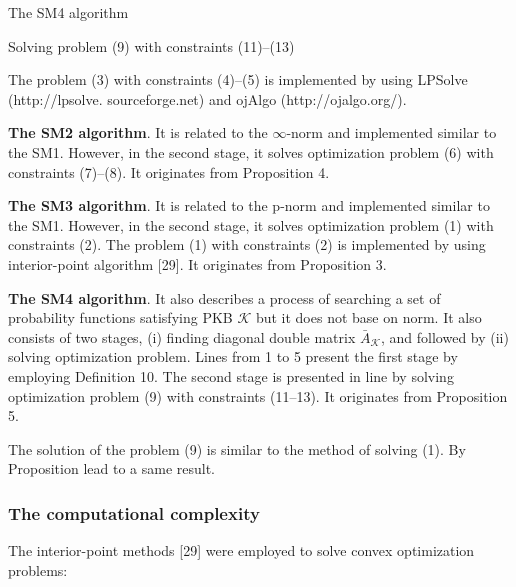 \documentclass[]{iosart2c}
\begin{document}
\begin{algorithm}
\caption{The SM4 algorithm}
\begin{algorithmic}[1]

	\Else 
	\EndIf
\EndFor
\EndFor
\State Solving problem (9) with constraints (11)–(13)
\State {}
\end{algorithmic}
\end{algorithm}

The problem (3) with constraints (4)–(5) is implemented by using LPSolve (http://lpsolve. sourceforge.net) and ojAlgo (http://ojalgo.org/).

\textbf{The SM2 algorithm}. It is related to the $\infty$-norm and implemented similar to the SM1. However, in the second stage, it solves optimization problem (6) with constraints (7)–(8). It originates from Proposition 4.

\textbf{The SM3 algorithm}. It is related to the p-norm and implemented similar to the SM1. However, in the second stage, it solves optimization problem (1) with constraints (2). The problem (1) with constraints (2) is implemented by using interior-point algorithm [29]. It originates from Proposition 3.

\textbf{The SM4 algorithm}. It also describes a process of searching a set of probability functions satisfying PKB $\mathcal{K}$ but it does not base on norm. It also consists of two stages, (i) finding diagonal double matrix $\bar{A}_\mathcal{K}$, and followed by (ii) solving optimization problem. Lines from 1 to 5 present the first stage by employing Definition 10. The second stage is presented in line by solving optimization problem (9) with constraints (11–13). It originates from Proposition 5.

The solution of the problem (9) is similar to the method of solving (1). By Proposition lead to a same result.

\subsubsection{The computational complexity}
The interior-point methods [29] were employed to
solve convex optimization problems:
\end{document}
